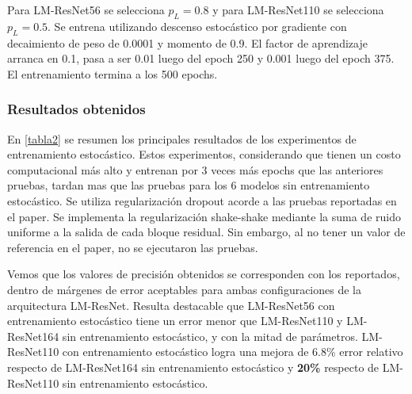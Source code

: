 \documentclass[titlepage,a4paper,oneside]{article}
\begin{document}
Para LM-ResNet56 se selecciona $p_L = 0.8$ y para LM-ResNet110 se selecciona $p_L = 0.5$. Se entrena utilizando descenso estocástico por gradiente con decaimiento de peso de 0.0001 y momento de 0.9. El factor de aprendizaje arranca en 0.1, pasa a ser 0.01 luego del epoch 250 y 0.001 luego del epoch 375. El entrenamiento termina a los 500 epochs.

\subsubsection{Resultados obtenidos}

En \ref{tabla2} se resumen los principales resultados de los experimentos de entrenamiento estocástico. Estos experimentos, considerando que tienen un costo computacional más alto y entrenan por 3 veces más epochs que las anteriores pruebas, tardan mas que las pruebas para los 6 modelos sin entrenamiento estocástico. Se utiliza regularización dropout acorde a las pruebas reportadas en el paper. Se implementa la regularización shake-shake mediante la suma de ruido uniforme a la salida de cada bloque residual. Sin embargo, al no tener un valor de referencia en el paper, no se ejecutaron las pruebas.

Vemos que los valores de precisión obtenidos se corresponden con los reportados, dentro de márgenes de error aceptables para ambas configuraciones de la arquitectura LM-ResNet. Resulta destacable que LM-ResNet56 con entrenamiento estocástico tiene un error menor que LM-ResNet110 y LM-ResNet164 sin entrenamiento estocástico, y con la mitad de parámetros. LM-ResNet110 con entrenamiento estocástico logra una mejora de 6.8\% error relativo respecto de LM-ResNet164 sin entrenamiento estocástico y \textbf{20\%} respecto de LM-ResNet110 sin entrenamiento estocástico.
\end{document}
